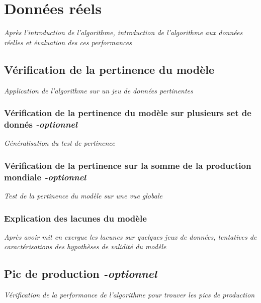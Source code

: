 \documentclass{article}
\begin{document}
\section{Données réels}
\textit{Après l'introduction de l'algorithme, introduction de l'algorithme aux données réelles et évaluation des ces performances}

\subsection{Vérification de la pertinence du modèle}
\textit{Application de l'algorithme sur un jeu de données pertinentes}

\subsubsection{Vérification de la pertinence du modèle sur plusieurs set de donnés \textit{-optionnel}}
\textit{Généralisation du test de pertinence}

\subsubsection{Vérification de la pertinence sur la somme de la production mondiale \textit{-optionnel}}
\textit{Test de la pertinence du modèle sur une vue globale}

\subsubsection{Explication des lacunes du modèle}
\textit{Après avoir mit en exergue les lacunes sur quelques jeux de données, tentatives de caractérisations des hypothèses de validité du modèle}

\subsection{Pic de production \textit{-optionnel}}
\textit{Vérification de la performance de l'algorithme pour trouver les pics de production}
\end{document}
